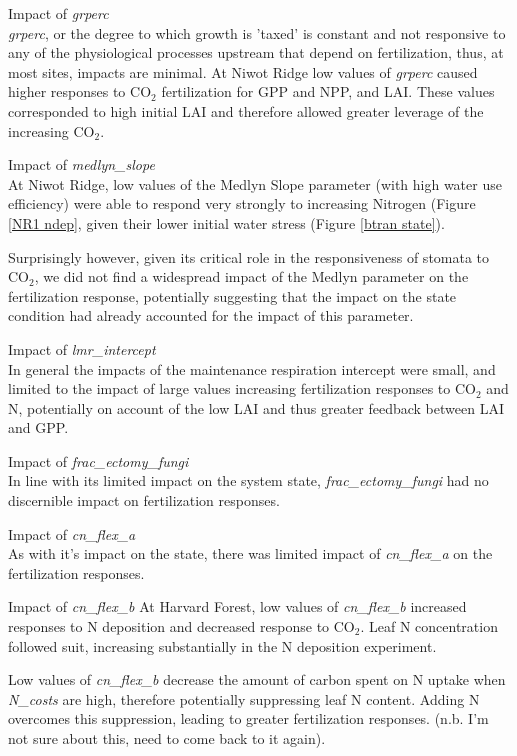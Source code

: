 \documentclass[draft,linenumbers]{agujournal}
\begin{document}
Impact of \emph{grperc}\\
\emph{grperc}, or the degree to which growth is 'taxed' is constant and not responsive to any of the physiological processes upstream that depend on fertilization, thus, at most sites, impacts are minimal. At Niwot Ridge low values of \emph{grperc} caused higher responses to CO$_{2}$ fertilization for GPP and NPP, and LAI.  These values corresponded to high initial LAI  and therefore allowed greater leverage of the increasing CO$_{2}$. 

Impact of \emph{medlyn\_slope}\\
At Niwot Ridge, low values of the Medlyn Slope parameter (with high water use efficiency) were able to respond very strongly to increasing Nitrogen (Figure \ref{NR1 ndep}, given their lower initial water stress (Figure \ref{btran state}).

Surprisingly however, given its critical role in the responsiveness of stomata to CO$_{2}$, we did not find a widespread impact of the Medlyn parameter on the fertilization response, potentially suggesting that the impact on the state condition had already accounted for the impact of this parameter. 

Impact of \emph{lmr\_intercept}\\
In general the impacts of the maintenance respiration intercept were small, and limited to the impact of large values increasing fertilization responses to CO$_{2}$ and N, potentially on account of the low LAI and thus greater feedback between LAI and GPP. 

Impact of \emph{frac\_ectomy\_fungi}\\
In line with its limited impact on the system state, \emph{frac\_ectomy\_fungi} had no discernible impact on fertilization responses. 

Impact of \emph{cn\_flex\_a}\\
As with it's impact on the state, there was limited impact of \emph{cn\_flex\_a} on the fertilization responses.

Impact of \emph{cn\_flex\_b}
At Harvard Forest, low values of  \emph{cn\_flex\_b} increased responses to N deposition and decreased response to CO$_{2}$. Leaf N concentration followed suit, increasing substantially in the N deposition experiment.

Low values of \emph{cn\_flex\_b} decrease the amount of carbon spent on N uptake when \emph{N\_costs} are high, therefore potentially suppressing leaf N content. Adding N overcomes this suppression, leading to greater fertilization responses. (n.b. I'm not sure about this, need to come back to it again). 
\end{document}

